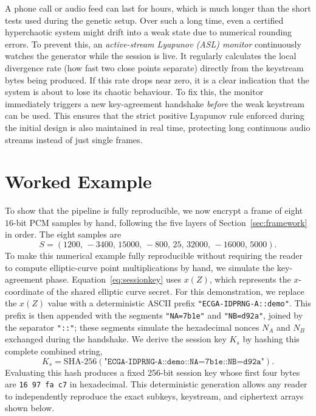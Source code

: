 \documentclass[pdflatex,sn-mathphys-num]{sn-jnl}%
\theoremstyle{thmstyleone}%
\theoremstyle{thmstyletwo}%
\theoremstyle{thmstylethree}%
\begin{document}
A phone call or audio feed can last for hours, which is much longer than the short tests used during the genetic setup. Over such a long time, even a certified hyperchaotic system might drift into a weak state due to numerical rounding errors. To prevent this, an \emph{active-stream Lyapunov (ASL) monitor} continuously watches the generator while the session is live. It regularly calculates the local divergence rate (how fast two close points separate) directly from the keystream bytes being produced. If this rate drops near zero, it is a clear indication that the system is about to lose its chaotic behaviour. To fix this, the monitor immediately triggers a new key-agreement handshake \emph{before} the weak keystream can be used. This ensures that the strict positive Lyapunov rule enforced during the initial design is also maintained in real time, protecting long continuous audio streams instead of just single frames.

\section{Worked Example}
\label{sec:worked}

To show that the pipeline is fully reproducible, we now encrypt a frame of eight $16$-bit PCM samples by hand, following the five layers of Section~\ref{sec:framework} in order. The eight samples are
\begin{equation}
S = (1200,\,-3400,\,15000,\,-800,\,25,\,32000,\,-16000,\,5000).
\label{eq:sample_values}
\end{equation}
To make this numerical example fully reproducible without requiring the reader to compute elliptic-curve point multiplications by hand, we simulate the key-agreement phase. Equation~\eqref{eq:sessionkey} uses $x(Z)$, which represents the $x$-coordinate of the shared elliptic curve secret. For this demonstration, we replace the $x(Z)$ value with a deterministic ASCII prefix \texttt{"ECGA-IDPRNG-A::demo"}. This prefix is then appended with the segments \texttt{"NA=7b1e"} and \texttt{"NB=d92a"}, joined by the separator \texttt{"::"}; these segments simulate the hexadecimal nonces $N_A$ and $N_B$ exchanged during the handshake. We derive the session key $K_s$ by hashing this complete combined string,
\begin{equation*}
K_s = \mathrm{SHA\text{-}256}(\texttt{"ECGA-IDPRNG-A::demo::NA=7b1e::NB=d92a"}).
\end{equation*}
Evaluating this hash produces a fixed 256-bit session key whose first four bytes are \texttt{16\,97\,fa\,c7} in hexadecimal. This deterministic generation allows any reader to independently reproduce the exact subkeys, keystream, and ciphertext arrays shown below.
\end{document}

